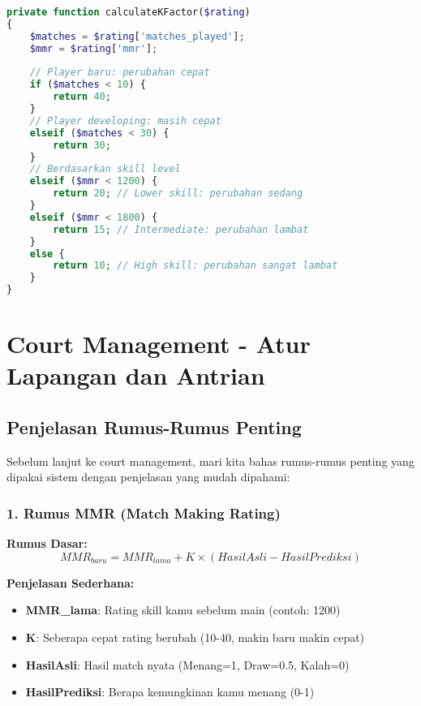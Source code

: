 \documentclass[12pt]{article}
\begin{document}
\begin{lstlisting}[language=PHP, caption=Calculation K-Factor]
private function calculateKFactor($rating)
{
    $matches = $rating['matches_played'];
    $mmr = $rating['mmr'];
    
    // Player baru: perubahan cepat
    if ($matches < 10) {
        return 40;
    }
    // Player developing: masih cepat
    elseif ($matches < 30) {
        return 30;
    }
    // Berdasarkan skill level
    elseif ($mmr < 1200) {
        return 20; // Lower skill: perubahan sedang
    }
    elseif ($mmr < 1800) {
        return 15; // Intermediate: perubahan lambat
    }
    else {
        return 10; // High skill: perubahan sangat lambat
    }
}
\end{lstlisting}

\section{Court Management - Atur Lapangan dan Antrian}

\subsection{Penjelasan Rumus-Rumus Penting}

Sebelum lanjut ke court management, mari kita bahas rumus-rumus penting yang dipakai sistem dengan penjelasan yang mudah dipahami:

\subsubsection{1. Rumus MMR (Match Making Rating)}

\textbf{Rumus Dasar:}
\begin{equation}
MMR_{baru} = MMR_{lama} + K \times (HasilAsli - HasilPrediksi)
\end{equation}

\textbf{Penjelasan Sederhana:}
\begin{itemize}
    \item \textbf{MMR\_lama}: Rating skill kamu sebelum main (contoh: 1200)
    \item \textbf{K}: Seberapa cepat rating berubah (10-40, makin baru makin cepat)
    \item \textbf{HasilAsli}: Hasil match nyata (Menang=1, Draw=0.5, Kalah=0)
    \item \textbf{HasilPrediksi}: Berapa kemungkinan kamu menang (0-1)
\end{itemize}
\end{document}
